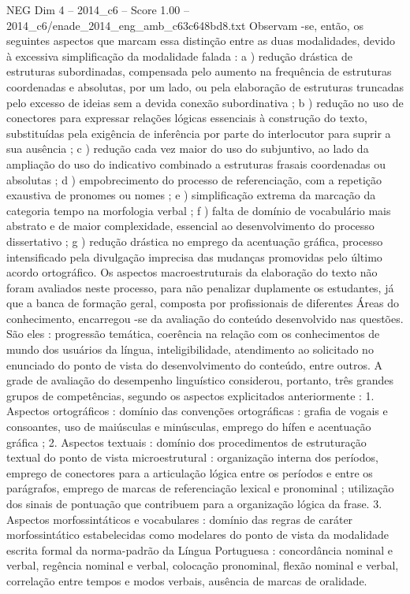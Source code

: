 \begin{textsample}{NEG Dim 4 – 2014\_c6 – Score 1.00 – 2014\_c6/enade\_2014\_eng\_amb\_c63c648bd8.txt}
Observam -se, então, os seguintes aspectos que marcam essa distinção entre as duas modalidades, devido à excessiva simplificação da modalidade falada : a ) redução drástica de estruturas subordinadas, compensada pelo aumento na frequência de estruturas coordenadas e absolutas, por um lado, ou pela elaboração de estruturas truncadas pelo excesso de ideias sem a devida conexão subordinativa ; b ) redução no uso de conectores para expressar relações lógicas essenciais à construção do texto, substituídas pela exigência de inferência por parte do interlocutor para suprir a sua ausência ; c ) redução cada vez maior do uso do subjuntivo, ao lado da ampliação do uso do indicativo combinado a estruturas frasais coordenadas ou absolutas ; d ) empobrecimento do processo de referenciação, com a repetição exaustiva de pronomes ou nomes ; e ) simplificação extrema da marcação da categoria tempo na morfologia verbal ; f ) falta de domínio de vocabulário mais abstrato e de maior complexidade, essencial ao desenvolvimento do processo dissertativo ; g ) redução drástica no emprego da acentuação gráfica, processo intensificado pela divulgação imprecisa das mudanças promovidas pelo último acordo ortográfico.
Os aspectos macroestruturais da elaboração do texto não foram avaliados neste processo, para não penalizar duplamente os estudantes, já que a banca de formação geral, composta por profissionais de diferentes Áreas do conhecimento, encarregou -se da avaliação do conteúdo desenvolvido nas questões.
São eles : progressão temática, coerência na relação com os conhecimentos de mundo dos usuários da língua, inteligibilidade, atendimento ao solicitado no enunciado do ponto de vista do desenvolvimento do conteúdo, entre outros.
A grade de avaliação do desempenho linguístico considerou, portanto, três grandes grupos de competências, segundo os aspectos explicitados anteriormente : 1.
Aspectos ortográficos : domínio das convenções ortográficas : grafia de vogais e consoantes, uso de maiúsculas e minúsculas, emprego do hífen e acentuação gráfica ; 2.
Aspectos textuais : domínio dos procedimentos de estruturação textual do ponto de vista microestrutural : organização interna dos períodos, emprego de conectores para a articulação lógica entre os períodos e entre os parágrafos, emprego de marcas de referenciação lexical e pronominal ; utilização dos sinais de pontuação que contribuem para a organização lógica da frase. 3.
Aspectos morfossintáticos e vocabulares : domínio das regras de caráter morfossintático estabelecidas como modelares do ponto de vista da modalidade escrita formal da norma-padrão da Língua Portuguesa : concordância nominal e verbal, regência nominal e verbal, colocação pronominal, flexão nominal e verbal, correlação entre tempos e modos verbais, ausência de marcas de oralidade.

\end{textsample}
